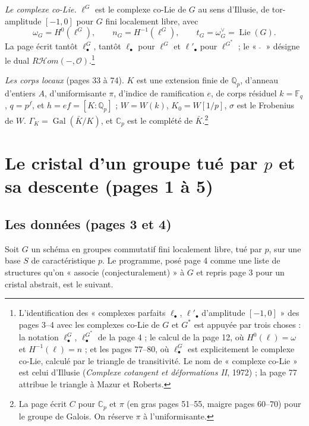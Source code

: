 \documentclass[11pt,a4paper]{article}
\begin{document}
\emph{Le complexe co-Lie.} $\ell^{G}$ est le complexe co-Lie de $G$ au sens
d'Illusie, de tor-amplitude $[-1, 0]$ pour $G$ fini localement libre, avec
\[
\omega_{G} = H^{0}(\ell^{G}), \qquad n_{G} = H^{-1}(\ell^{G}), \qquad
t_{G} = \omega_{G}^{\vee} = \operatorname{Lie}(G).
\]
La page écrit tantôt $\ell^{G}_{\bullet}$, tantôt $\ell_{\bullet}$ pour
$\ell^{G}$ et $\ell'_{\bullet}$ pour $\ell^{G^{*}}$ ; le « $\check{\ ~}$ »
désigne le dual $R\mathcal{H}om(-, \mathcal{O})$.\footnote{L'identification
des « complexes parfaits $\ell_{\bullet}$, $\ell'_{\bullet}$ d'amplitude
$[-1,0]$ » des pages 3--4 avec les complexes co-Lie de $G$ et $G^{*}$ est
appuyée par trois choses : la notation $\ell^{G}_{\bullet}$, $\ell^{G^{*}}_{\bullet}$
de la page 4 ; le calcul de la page 12, où $H^{0}(\ell) = \omega$ et
$H^{-1}(\ell) = n$ ; et les pages 77--80, où $\ell^{G}_{\bullet}$ est
explicitement le complexe co-Lie, calculé par le triangle de transitivité. Le
nom de « complexe co-Lie » est celui d'Illusie (\emph{Complexe cotangent et
déformations II}, 1972) ; la page 77 attribue le triangle à Mazur et Roberts.}

\emph{Les corps locaux} (pages 33 à 74). $K$ est une extension finie de
$\mathbb{Q}_{p}$, d'anneau d'entiers $A$, d'uniformisante $\pi$, d'indice de
ramification $e$, de corps résiduel $k = \mathbb{F}_{q}$, $q = p^{f}$, et
$h = ef = [K : \mathbb{Q}_{p}]$ ; $W = W(k)$, $K_{0} = W[1/p]$, $\sigma$ est le
Frobenius de $W$. $\Gamma_{K} = \operatorname{Gal}(\bar K/K)$, et
$\mathbb{C}_{p}$ est le complété de $\bar K$.\footnote{La page écrit $C$ pour
$\mathbb{C}_{p}$ et $\pi$ (en gras pages 51--55, maigre pages 60--70) pour le
groupe de Galois. On réserve $\pi$ à l'uniformisante.}

\section*{Le cristal d'un groupe tué par $p$ et sa descente (pages 1 à 5)}

\subsection*{Les données (pages 3 et 4)}

Soit $G$ un schéma en groupes commutatif fini localement libre, tué par $p$,
sur une base $S$ de caractéristique $p$. Le programme, posé page 4 comme une
liste de structures qu'on « associe (conjecturalement) » à $G$ et repris page 3
pour un cristal abstrait, est le suivant.
\end{document}
